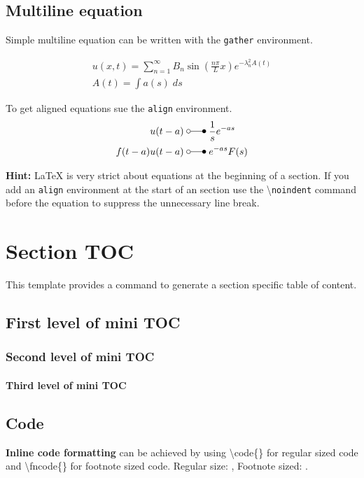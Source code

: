 \documentclass[\fontheight]{extarticle}
\begin{document}
\begin{multicols*}{3}
    \subsection{Multiline equation}
    Simple multiline equation can be written with the \texttt{gather} environment.
    
    \begin{gather*}
        u(x,t) =\sum_{n=1}^\infty B_n\sin(\frac{n\pi}Lx)e^{-\lambda_n^2 A(t)} \\
        A(t)=\int a(s)\;ds
    \end{gather*}
    
    To get aligned equations sue the \texttt{align} environment.
    \begin{align*}
        u(t-a)       \; & \laplace\; \frac{1}{s}e^{-as} \\
        f(t-a)u(t-a) \; & \laplace\; e^{-as}F(s)
    \end{align*}
    
    \textbf{Hint:} \LaTeX{} is very strict about equations at the beginning of a section.
    If you add an \texttt{align} environment at the start of an section use the
    \textbackslash{}\texttt{noindent} command before the equation to suppress the unnecessary
    line break.
    
    \section{Section TOC}
    This template provides a command to generate a section specific table of content.
    \createsectiontoc{}
    
    \subsection{First level of mini TOC}
    \subsubsection{Second level of mini TOC}
    \paragraph{Third level of mini TOC}
    
    \subsection{Code}
    \textbf{Inline code formatting} can be achieved by using \textbackslash{code}\{\} for regular sized code
    and \textbackslash{fncode}\{\} for footnote sized code.\newline
    Regular size: ,\newline 
    Footnote sized: .\vspace*{4pt}
    

\end{multicols*}
\end{document}
